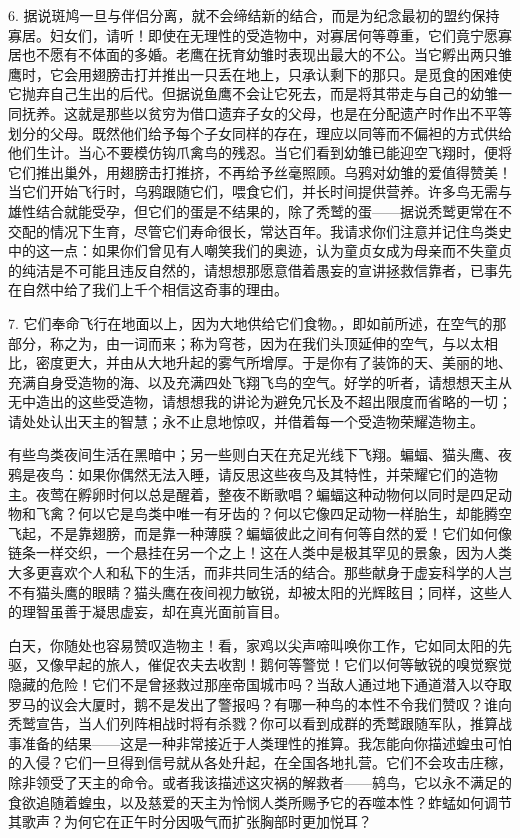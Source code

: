 6. 据说斑鸠一旦与伴侣分离，就不会缔结新的结合，而是为纪念最初的盟约保持寡居。妇女们，请听！即使在无理性的受造物中，对寡居何等尊重，它们竟宁愿寡居也不愿有不体面的多婚。老鹰在抚育幼雏时表现出最大的不公。当它孵出两只雏鹰时，它会用翅膀击打并推出一只丢在地上，只承认剩下的那只。是觅食的困难使它抛弃自己生出的后代。但据说鱼鹰不会让它死去，而是将其带走与自己的幼雏一同抚养。这就是那些以贫穷为借口遗弃子女的父母，也是在分配遗产时作出不平等划分的父母。既然他们给予每个子女同样的存在，理应以同等而不偏袒的方式供给他们生计。当心不要模仿钩爪禽鸟的残忍。当它们看到幼雏已能迎空飞翔时，便将它们推出巢外，用翅膀击打推挤，不再给予丝毫照顾。乌鸦对幼雏的爱值得赞美！当它们开始飞行时，乌鸦跟随它们，喂食它们，并长时间提供营养。许多鸟无需与雄性结合就能受孕，但它们的蛋是不结果的，除了秃鹫的蛋——据说秃鹫更常在不交配的情况下生育，尽管它们寿命很长，常达百年。我请求你们注意并记住鸟类史中的这一点：如果你们曾见有人嘲笑我们的奥迹，认为童贞女成为母亲而不失童贞的纯洁是不可能且违反自然的，请想想那愿意借着愚妄的宣讲拯救信靠者，已事先在自然中给了我们上千个相信这奇事的理由。\par

7. 它们奉命飞行在地面以上，因为大地供给它们食物。，即如前所述，在空气的那部分，称之为，由一词而来；称为穹苍，因为在我们头顶延伸的空气，与以太相比，密度更大，并由从大地升起的雾气所增厚。于是你有了装饰的天、美丽的地、充满自身受造物的海、以及充满四处飞翔飞鸟的空气。好学的听者，请想想天主从无中造出的这些受造物，请想想我的讲论为避免冗长及不超出限度而省略的一切；请处处认出天主的智慧；永不止息地惊叹，并借着每一个受造物荣耀造物主。\par

有些鸟类夜间生活在黑暗中；另一些则白天在充足光线下飞翔。蝙蝠、猫头鹰、夜鸦是夜鸟：如果你偶然无法入睡，请反思这些夜鸟及其特性，并荣耀它们的造物主。夜莺在孵卵时何以总是醒着，整夜不断歌唱？蝙蝠这种动物何以同时是四足动物和飞禽？何以它是鸟类中唯一有牙齿的？何以它像四足动物一样胎生，却能腾空飞起，不是靠翅膀，而是靠一种薄膜？蝙蝠彼此之间有何等自然的爱！它们如何像链条一样交织，一个悬挂在另一个之上！这在人类中是极其罕见的景象，因为人类大多更喜欢个人和私下的生活，而非共同生活的结合。那些献身于虚妄科学的人岂不有猫头鹰的眼睛？猫头鹰在夜间视力敏锐，却被太阳的光辉眩目；同样，这些人的理智虽善于凝思虚妄，却在真光面前盲目。\par

白天，你随处也容易赞叹造物主！看，家鸡以尖声啼叫唤你工作，它如同太阳的先驱，又像早起的旅人，催促农夫去收割！鹅何等警觉！它们以何等敏锐的嗅觉察觉隐藏的危险！它们不是曾拯救过那座帝国城市吗？当敌人通过地下通道潜入以夺取罗马的议会大厦时，鹅不是发出了警报吗？有哪一种鸟的本性不令我们赞叹？谁向秃鹫宣告，当人们列阵相战时将有杀戮？你可以看到成群的秃鹫跟随军队，推算战事准备的结果——这是一种非常接近于人类理性的推算。我怎能向你描述蝗虫可怕的入侵？它们一旦得到信号就从各处升起，在全国各地扎营。它们不会攻击庄稼，除非领受了天主的命令。或者我该描述这灾祸的解救者——鸫鸟，它以永不满足的食欲追随着蝗虫，以及慈爱的天主为怜悯人类所赐予它的吞噬本性？蚱蜢如何调节其歌声？为何它在正午时分因吸气而扩张胸部时更加悦耳？\par

